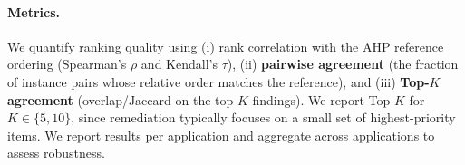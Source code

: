 \documentclass[12pt]{article}
\begin{document}
\paragraph{Metrics.}
We quantify ranking quality using (i) rank correlation with the AHP reference ordering (Spearman's $\rho$ and Kendall's $\tau$), (ii) \textbf{pairwise agreement} (the fraction of instance pairs whose relative order matches the reference), and (iii) \textbf{Top-$K$ agreement} (overlap/Jaccard on the top-$K$ findings). We report Top-$K$ for $K \in \{5,10\}$, since remediation typically focuses on a small set of highest-priority items. We report results per application and aggregate across applications to assess robustness.



\newpage
\end{document}
